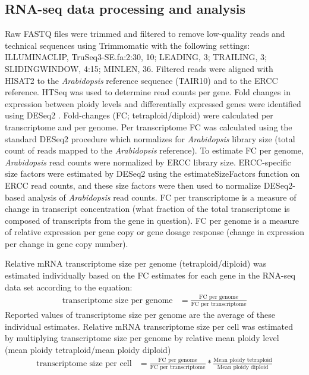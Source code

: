 \documentclass[11pt]{article}
\begin{document}
\subsection*{RNA-seq data processing and analysis}
Raw FASTQ files were trimmed and filtered to remove low-quality reads and technical sequences using Trimmomatic \citep{bolger2014} with the following settings: ILLUMINACLIP, TruSeq3-SE.fa:2:30, 10; LEADING, 3; TRAILING, 3; SLIDINGWINDOW, 4:15; MINLEN, 36. Filtered reads were aligned with HISAT2 \citep{pertea2016} to the {\it Arabidopsis} reference sequence (TAIR10) and to the ERCC reference. HTSeq \citep{anders2015} was used to determine read counts per gene. Fold changes in expression between ploidy levels and differentially expressed genes were identified using DESeq2 \citep{love2014}. Fold-changes (FC; tetraploid/diploid) were calculated per transcriptome and per genome. Per transcriptome FC was calculated using the standard DESeq2 procedure which normalizes for {\it Arabidopsis} library size (total count of reads mapped to the {\it Arabidopsis} reference). To estimate FC per genome, {\it Arabidopsis} read counts were normalized by ERCC library size. ERCC-specific size factors were estimated by DESeq2 using the estimateSizeFactors function on ERCC read counts, and these size factors were then used to normalize DESeq2-based analysis of {\it Arabidopsis} read counts. FC per transcriptome is a measure of change in transcript concentration (what fraction of the total transcriptome is composed of transcripts from the gene in question). FC per genome is a measure of relative expression per gene copy or gene dosage response (change in expression per change in gene copy number).

Relative mRNA transcriptome size per genome (tetraploid/diploid) was estimated individually based on the FC estimates for each gene in the RNA-seq data set according to the equation:
\begin{align*}
\text{transcriptome size per genome}&=\frac{\text{FC per genome}}{\text{FC per transcriptome}}
\end{align*}
Reported values of transcriptome size per genome are the average of these individual estimates. Relative mRNA transcriptome size per cell was estimated by multiplying transcriptome size per genome by relative mean ploidy level (mean ploidy tetraploid/mean ploidy diploid)
\begin{align*}
\text{transcriptome size per cell}&=\frac{\text{FC per genome}}{\text{FC per transcriptome}}*\frac{\text{Mean ploidy tetraploid}}{\text{Mean ploidy diploid}}
\end{align*}
\end{document}
